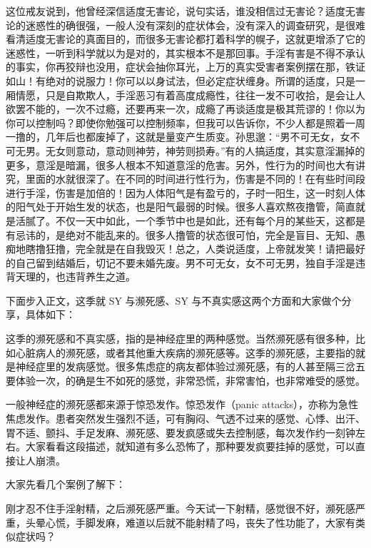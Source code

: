 \begin{case}
    这位戒友说到，他曾经深信适度无害论，说句实话，谁没相信过无害论？适度无害论的迷惑性的确很强，一般人没有深刻的症状体会，没有深入的调查研究，是很难看清适度无害论的真面目的，而很多无害论都打着科学的幌子，这就更增添了它的迷惑性，一听到科学就以为是对的，其实根本不是那回事。手淫有害是不得不承认的事实，你再狡辩也没用，症状会抽你耳光，上万的真实受害者案例摆在那，铁证如山！有绝对的说服力！你可以以身试法，但必定症状缠身。所谓的适度，只是一厢情愿，只是自欺欺人，手淫恶习有着高度成瘾性，往往一发不可收拾，是会让人欲罢不能的，一次不过瘾，还要再来一次，成瘾了再谈适度是极其荒谬的！你以为你可以控制吗？即使你勉强可以控制频率，但我可以告诉你，不少人都是照着一周一撸的，几年后也都废掉了，这就是量变产生质变。孙思邈：“男不可无女，女不可无男。无女则意动，意动则神劳，神劳则损寿。”有的人搞适度，其实意淫漏掉的更多，意淫是暗漏，很多人根本不知道意淫的危害。另外，性行为的时间也大有讲究，里面的水就很深了。在不同的时间进行性行为，伤害是不同的！在有些时间段进行手淫，伤害是加倍的！因为人体阳气是有盈亏的，子时一阳生，这一时刻人体的阳气处于开始生发的状态，也是阳气最弱的时候。很多人喜欢熬夜撸管，简直就是活腻了。不仅一天中如此，一个季节中也是如此，还有每个月的某些天，这都是有忌讳的，是绝对不能乱来的。很多人撸管的状态很可怕，完全是盲目、无知、愚痴地瞎撸狂撸，完全就是在自我毁灭！总之，人类说适度，上帝就发笑！请把最好的自己留到结婚后，切记不要未婚先废。男不可无女，女不可无男，独自手淫是违背天理的，也违背养生之道。
\end{case}

下面步入正文，这季就 SY 与濒死感、SY 与不真实感这两个方面和大家做个分享，具体如下：

这季的濒死感和不真实感，指的是神经症里的两种感觉。当然濒死感有很多种，比如心脏病人的濒死感，或者其他重大疾病的濒死感等。这季的濒死感，主要指的就是神经症里的发病感觉。很多焦虑症的病友都体验过濒死感，有的人甚至隔三岔五要体验一次，的确是生不如死的感觉，非常恐慌，非常害怕，也非常难受的感觉。

一般神经症的濒死感都来源于惊恐发作。惊恐发作（panic attacks），亦称为急性焦虑发作。患者突然发生强烈不适，可有胸闷、气透不过来的感觉、心悸、出汗、胃不适、颤抖、手足发麻、濒死感、要发疯感或失去控制感，每次发作约一刻钟左右。大家看看这段描述，就知道有多么恐怖了，那种要发疯要挂掉的感觉，可以直接让人崩溃。

大家先看几个案例了解下：

\begin{case}[濒死感]
    刚才忍不住手淫射精，之后濒死感严重。今天试一下射精，感觉很不好，濒死感严重，头晕心慌，手脚发麻，难道以后就不能射精了吗，丧失了性功能了，大家有类似症状吗？
\end{case}

